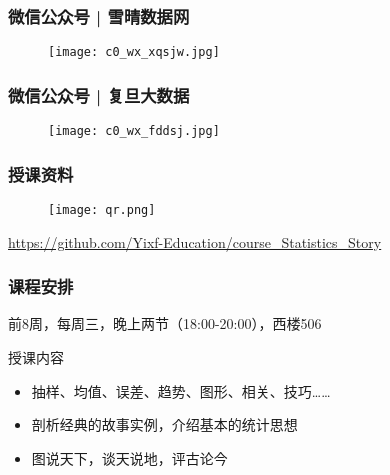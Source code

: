 \begin{frame}
  \frametitle{微信公众号 | 雪晴数据网}
  \begin{figure}
    \centering
    \texttt{[image: c0\_wx\_xqsjw.jpg]}
  \end{figure}
\end{frame}
\begin{frame}
  \frametitle{微信公众号 | 复旦大数据}
  \begin{figure}
    \centering
    \texttt{[image: c0\_wx\_fddsj.jpg]}
  \end{figure}
\end{frame}

\begin{frame}
  \frametitle{授课资料}
  \begin{figure}
    \centering
    \texttt{[image: qr.png]}
  \end{figure}
  \begin{center}
    \href{https://github.com/Yixf-Education/course_Statistics_Story}{https://github.com/Yixf-Education/course\_Statistics\_Story}
  \end{center}
\end{frame}


\begin{frame}
  \frametitle{课程安排}
  \begin{center}
  \alert{前8周，每周三，晚上两节（18:00-20:00），西楼506}\\
  \vspace{0.2cm}
  \end{center}
  \begin{block}{授课内容}
    \begin{itemize}
      \item 抽样、均值、误差、趋势、图形、相关、技巧……
      \item 剖析经典的故事实例，介绍基本的统计思想
      \item 图说天下，谈天说地，评古论今
    \end{itemize}
  \end{block}
\end{frame}

